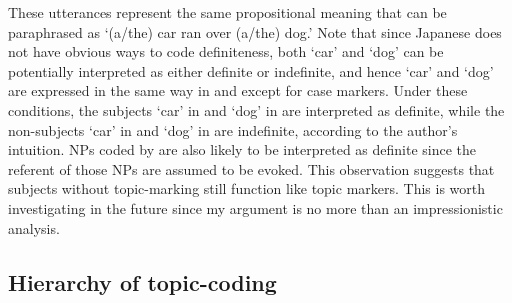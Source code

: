 These utterances represent the same propositional meaning
that can be paraphrased as `(a/the) car ran over (a/the) dog.'
Note that
since Japanese does not have obvious ways to code definiteness,
both `car' and `dog' can be potentially interpreted as either definite or indefinite,
and hence `car' and `dog' are expressed in the same way in \LLast and \Last
except for case markers.
Under these conditions,
the subjects `car' in \LLast and `dog' in \Last are interpreted as definite, %
while the non-subjects `car' in \Last and `dog' in \LLast are indefinite,
according to the author's intuition.
NPs coded by  are also likely to be interpreted as definite since
the referent of those NPs are assumed to be evoked.
This observation suggests that subjects without topic-marking still function like topic markers.
This is worth investigating in the future
since my argument is no more than an impressionistic analysis.


%


\subsection{Hierarchy of topic-coding}\label{Par:ArgStr:TopHierarchy}

